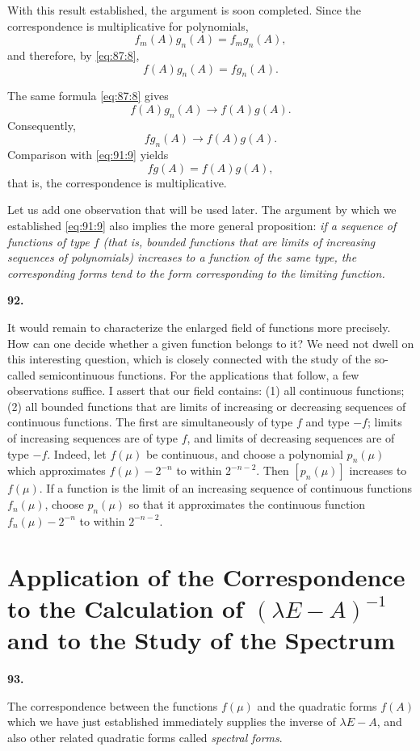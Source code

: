 \documentclass[
  paper=b5,
  fontsize=13pt,
  twoside=true,
  open=any,
  bookmarkpackage=false,
  chapterprefix=true,
  headings=normal
]{scrbook}
\theoremstyle{definition}
\newcommand{\numberedparagraph}[1]{%
  \par\medskip\phantomsection\label{sec:#1}%
  \noindent\textbf{#1.}\enspace
}
\begin{document}
With this result established, the argument is soon completed.  Since the
correspondence is multiplicative for polynomials,
\[
  f_m(A)g_n(A)=f_mg_n(A),
\]
and therefore, by \eqref{eq:87:8},
\[
  f(A)g_n(A)=fg_n(A).
\]

The same formula \eqref{eq:87:8} gives
\[
  f(A)g_n(A)\longrightarrow f(A)g(A).
\]
Consequently,
\[
  fg_n(A)\longrightarrow f(A)g(A).
\]
Comparison with \eqref{eq:91:9} yields
\[
  fg(A)=f(A)g(A),
\]
that is, the correspondence is multiplicative.

Let us add one observation that will be used later.  The argument by which we
established \eqref{eq:91:9} also implies the more general proposition:
\emph{if a sequence of functions of type \(f\) (that is, bounded functions that
are limits of increasing sequences of polynomials) increases to a function of
the same type, the corresponding forms tend to the form corresponding to the
limiting function.}

\numberedparagraph{92}
It would remain to characterize the enlarged field of functions more precisely.
How can one decide whether a given function belongs to it?  We need not dwell on
this interesting question, which is closely connected with the study of the
so-called semicontinuous functions.  For the applications that follow, a few
observations suffice.  I assert that our field contains: (1) all continuous
functions; (2) all bounded functions that are limits of increasing or decreasing
sequences of continuous functions.  The first are simultaneously of type \(f\)
and type \(-f\); limits of increasing sequences are of type \(f\), and limits of
decreasing sequences are of type \(-f\).  Indeed, let \(f(\mu)\) be continuous,
and choose a polynomial \(p_n(\mu)\) which approximates
\(f(\mu)-2^{-n}\) to within \(2^{-n-2}\).  Then \([p_n(\mu)]\) increases to
\(f(\mu)\).  If a function is the limit of an increasing sequence of continuous
functions \(f_n(\mu)\), choose \(p_n(\mu)\) so that it approximates the
continuous function \(f_n(\mu)-2^{-n}\) to within \(2^{-n-2}\).

\section{Application of the Correspondence to the Calculation of
\texorpdfstring{\((\lambda E-A)^{-1}\)}{(lambda E - A) inverse} and to the
Study of the Spectrum}

\numberedparagraph{93}
The correspondence between the functions \(f(\mu)\) and the quadratic forms
\(f(A)\) which we have just established immediately supplies the inverse of
\(\lambda E-A\), and also other related quadratic forms called \emph{spectral
forms}.
\end{document}
